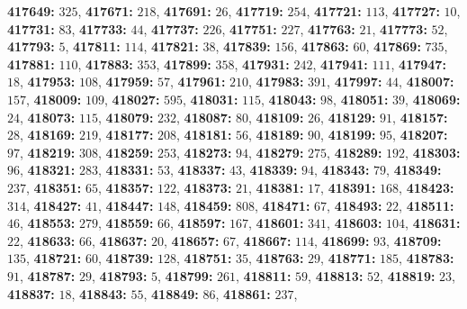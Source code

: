 \textsf{\bfseries 417649:} $325$, \textsf{\bfseries 417671:} $218$, \textsf{\bfseries 417691:} $26$, \textsf{\bfseries 417719:} $254$, \textsf{\bfseries 417721:} $113$, \textsf{\bfseries 417727:} $10$, \textsf{\bfseries 417731:} $83$, \textsf{\bfseries 417733:} $44$, \textsf{\bfseries 417737:} $226$, \textsf{\bfseries 417751:} $227$, \textsf{\bfseries 417763:} $21$, \textsf{\bfseries 417773:} $52$, \textsf{\bfseries 417793:} $5$, \textsf{\bfseries 417811:} $114$, \textsf{\bfseries 417821:} $38$, \textsf{\bfseries 417839:} $156$, \textsf{\bfseries 417863:} $60$, \textsf{\bfseries 417869:} $735$, \textsf{\bfseries 417881:} $110$, \textsf{\bfseries 417883:} $353$, \textsf{\bfseries 417899:} $358$, \textsf{\bfseries 417931:} $242$, \textsf{\bfseries 417941:} $111$, \textsf{\bfseries 417947:} $18$, \textsf{\bfseries 417953:} $108$, \textsf{\bfseries 417959:} $57$, \textsf{\bfseries 417961:} $210$, \textsf{\bfseries 417983:} $391$, \textsf{\bfseries 417997:} $44$, \textsf{\bfseries 418007:} $157$, \textsf{\bfseries 418009:} $109$, \textsf{\bfseries 418027:} $595$, \textsf{\bfseries 418031:} $115$, \textsf{\bfseries 418043:} $98$, \textsf{\bfseries 418051:} $39$, \textsf{\bfseries 418069:} $24$, \textsf{\bfseries 418073:} $115$, \textsf{\bfseries 418079:} $232$, \textsf{\bfseries 418087:} $80$, \textsf{\bfseries 418109:} $26$, \textsf{\bfseries 418129:} $91$, \textsf{\bfseries 418157:} $28$, \textsf{\bfseries 418169:} $219$, \textsf{\bfseries 418177:} $208$, \textsf{\bfseries 418181:} $56$, \textsf{\bfseries 418189:} $90$, \textsf{\bfseries 418199:} $95$, \textsf{\bfseries 418207:} $97$, \textsf{\bfseries 418219:} $308$, \textsf{\bfseries 418259:} $253$, \textsf{\bfseries 418273:} $94$, \textsf{\bfseries 418279:} $275$, \textsf{\bfseries 418289:} $192$, \textsf{\bfseries 418303:} $96$, \textsf{\bfseries 418321:} $283$, \textsf{\bfseries 418331:} $53$, \textsf{\bfseries 418337:} $43$, \textsf{\bfseries 418339:} $94$, \textsf{\bfseries 418343:} $79$, \textsf{\bfseries 418349:} $237$, \textsf{\bfseries 418351:} $65$, \textsf{\bfseries 418357:} $122$, \textsf{\bfseries 418373:} $21$, \textsf{\bfseries 418381:} $17$, \textsf{\bfseries 418391:} $168$, \textsf{\bfseries 418423:} $314$, \textsf{\bfseries 418427:} $41$, \textsf{\bfseries 418447:} $148$, \textsf{\bfseries 418459:} $808$, \textsf{\bfseries 418471:} $67$, \textsf{\bfseries 418493:} $22$, \textsf{\bfseries 418511:} $46$, \textsf{\bfseries 418553:} $279$, \textsf{\bfseries 418559:} $66$, \textsf{\bfseries 418597:} $167$, \textsf{\bfseries 418601:} $341$, \textsf{\bfseries 418603:} $104$, \textsf{\bfseries 418631:} $22$, \textsf{\bfseries 418633:} $66$, \textsf{\bfseries 418637:} $20$, \textsf{\bfseries 418657:} $67$, \textsf{\bfseries 418667:} $114$, \textsf{\bfseries 418699:} $93$, \textsf{\bfseries 418709:} $135$, \textsf{\bfseries 418721:} $60$, \textsf{\bfseries 418739:} $128$, \textsf{\bfseries 418751:} $35$, \textsf{\bfseries 418763:} $29$, \textsf{\bfseries 418771:} $185$, \textsf{\bfseries 418783:} $91$, \textsf{\bfseries 418787:} $29$, \textsf{\bfseries 418793:} $5$, \textsf{\bfseries 418799:} $261$, \textsf{\bfseries 418811:} $59$, \textsf{\bfseries 418813:} $52$, \textsf{\bfseries 418819:} $23$, \textsf{\bfseries 418837:} $18$, \textsf{\bfseries 418843:} $55$, \textsf{\bfseries 418849:} $86$, \textsf{\bfseries 418861:} $237$, 
